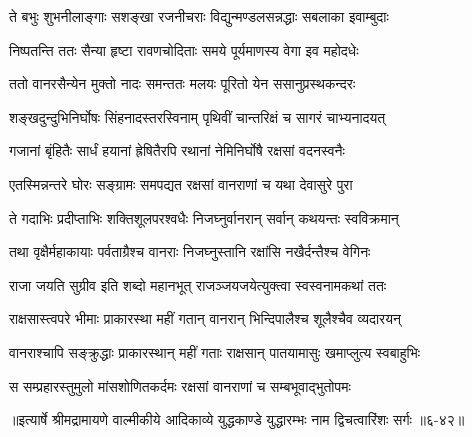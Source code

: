 \twolineshloka
{ते बभुः शुभनीलाङ्गाः सशङ्खा रजनीचराः}
{विद्युन्मण्डलसन्नद्धाः सबलाका इवाम्बुदाः} %

\twolineshloka
{निष्पतन्ति ततः सैन्या हृष्टा रावणचोदिताः}
{समये पूर्यमाणस्य वेगा इव महोदधेः} %

\twolineshloka
{ततो वानरसैन्येन मुक्तो नादः समन्ततः}
{मलयः पूरितो येन ससानुप्रस्थकन्दरः} %

\twolineshloka
{शङ्खदुन्दुभिनिर्घोषः सिंहनादस्तरस्विनाम्}
{पृथिवीं चान्तरिक्षं च सागरं चाभ्यनादयत्} %

\twolineshloka
{गजानां बृंहितैः सार्धं हयानां ह्रेषितैरपि}
{रथानां नेमिनिर्घोषै रक्षसां वदनस्वनैः} %

\twolineshloka
{एतस्मिन्नन्तरे घोरः सङ्ग्रामः समपद्यत}
{रक्षसां वानराणां च यथा देवासुरे पुरा} %

\twolineshloka
{ते गदाभिः प्रदीप्ताभिः शक्तिशूलपरश्वधैः}
{निजघ्नुर्वानरान् सर्वान् कथयन्तः स्वविक्रमान्} %

\twolineshloka
{तथा वृक्षैर्महाकायाः पर्वताग्रैश्च वानराः}
{निजघ्नुस्तानि रक्षांसि नखैर्दन्तैश्च वेगिनः} %

\twolineshloka
{राजा जयति सुग्रीव इति शब्दो महानभूत्}
{राजञ्जयजयेत्युक्त्वा स्वस्वनामकथां ततः} %

\twolineshloka
{राक्षसास्त्वपरे भीमाः प्राकारस्था महीं गतान्}
{वानरान् भिन्दिपालैश्च शूलैश्चैव व्यदारयन्} %

\twolineshloka
{वानराश्चापि सङ्क्रुद्धाः प्राकारस्थान् महीं गताः}
{राक्षसान् पातयामासुः खमाप्लुत्य स्वबाहुभिः} %

\twolineshloka
{स सम्प्रहारस्तुमुलो मांसशोणितकर्दमः}
{रक्षसां वानराणां च सम्बभूवाद्भुतोपमः} %


॥इत्यार्षे श्रीमद्रामायणे वाल्मीकीये आदिकाव्ये युद्धकाण्डे युद्धारम्भः नाम द्विचत्वारिंशः सर्गः ॥६-४२॥
